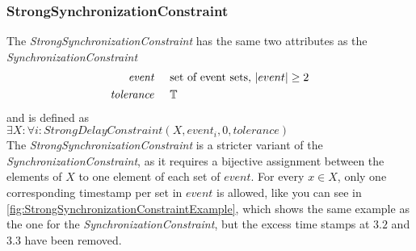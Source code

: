 	\subsubsection{StrongSynchronizationConstraint}
		The \emph{StrongSynchronizationConstraint} has the same two attributes as the \emph{SynchronizationConstraint}
		\begin{align*}
			\emph{event} & \hspace{.5cm}\text{set of event sets, $|event|\geq 2$}\\
			\emph{tolerance} & \hspace{.5cm}\mathbb{T}
		\end{align*}
		and is defined as\\[10pt]
		\begin{math}
			\exists X: \forall i: StrongDelayConstraint(X, event_i, 0, tolerance)
		\end{math}\\[10pt]
		The \emph{StrongSynchronizationConstraint} is a stricter variant of the \emph{SynchronizationConstraint}, as it requires a bijective assignment between the elements of $X$ to one element of each set of $event$. For every $x\in X$, only one corresponding timestamp per set in $event$ is allowed, like you can see in \ref{fig:StrongSynchronizationConstraintExample}, which shows the same example as the one for the \emph{SynchronizationConstraint}, but the excess time stamps at $3.2$ and $3.3$ have been removed.
